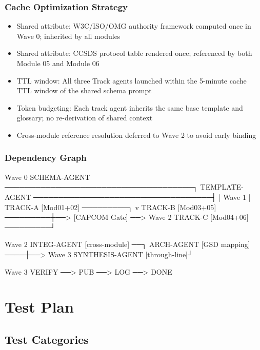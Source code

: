 \documentclass[11pt,letterpaper]{article}
\begin{document}
\subsubsection{Cache Optimization Strategy}
\begin{itemize}[noitemsep]
  \item Shared attribute: W3C/ISO/OMG authority framework computed once in Wave 0; inherited by all modules
  \item Shared attribute: CCSDS protocol table rendered once; referenced by both Module 05 and Module 06
  \item TTL window: All three Track agents launched within the 5-minute cache TTL window of the shared schema prompt
  \item Token budgeting: Each track agent inherits the same base template and glossary; no re-derivation of shared context
  \item Cross-module reference resolution deferred to Wave 2 to avoid early binding
\end{itemize}

\subsubsection{Dependency Graph}

\begin{asciibox}
Wave 0
  SCHEMA-AGENT ─────────────────────────────────────┐
  TEMPLATE-AGENT ───────────────────────────────────┤
                                                     |
Wave 1                                               |
  TRACK-A [Mod01+02] ─────────┐                     v
  TRACK-B [Mod03+05] ─────────┼──> [CAPCOM Gate] ──> Wave 2
  TRACK-C [Mod04+06] ─────────┘

Wave 2
  INTEG-AGENT [cross-module] ──┐
  ARCH-AGENT [GSD mapping] ────┼──> Wave 3
  SYNTHESIS-AGENT [through-line]┘

Wave 3
  VERIFY ──> PUB ──> LOG ──> DONE
\end{asciibox}

\section{Test Plan}

\subsection{Test Categories}
\end{document}
